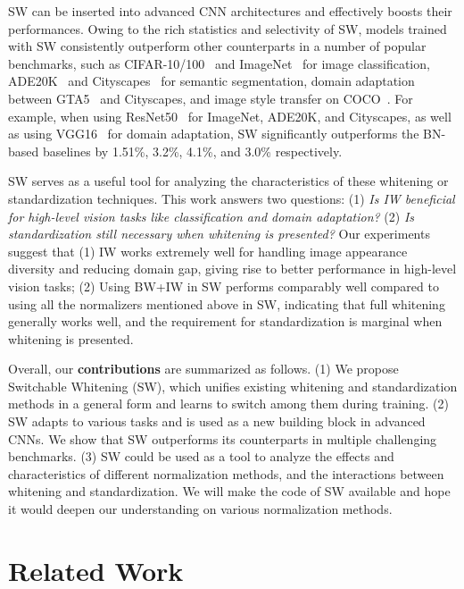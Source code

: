 \documentclass[10pt,twocolumn,letterpaper]{article}
\begin{document}
SW can be inserted into advanced CNN architectures and effectively boosts their performances.
Owing to the rich statistics and selectivity of SW, models trained with SW consistently outperform other counterparts in a number of popular benchmarks, such as CIFAR-10/100~\cite{krizhevsky2009learning} and ImageNet~\cite{deng2009imagenet} for image classification, ADE20K~\cite{zhou2017scene} and Cityscapes~\cite{cordts2016cityscapes} for semantic segmentation, domain adaptation between GTA5~\cite{Richter_2016_ECCV} and Cityscapes, and image style transfer on COCO~\cite{lin2014microsoft}.
For example, when using ResNet50~\cite{he2016deep} for ImageNet, ADE20K, and Cityscapes, as well as using VGG16~\cite{simonyan2014very} for domain adaptation, SW significantly outperforms the BN-based baselines by 1.51\%, 3.2\%, 4.1\%, and 3.0\% respectively.

SW serves as a useful tool for analyzing the characteristics of these whitening or standardization techniques.
This work answers two questions: 
(1) \textit{Is IW beneficial for high-level vision tasks like classification and domain adaptation?} 
(2) \textit{Is standardization still necessary when whitening is presented?}
Our experiments suggest that (1) IW works extremely well for handling image appearance diversity and reducing domain gap, giving rise to better performance in high-level vision tasks;
(2) Using BW+IW in SW performs comparably well compared to using all the normalizers mentioned above in SW, indicating that full whitening generally works well, and the requirement for standardization is marginal when whitening is presented.




Overall, our \textbf{contributions} are summarized as follows. 
(1) We propose Switchable Whitening (SW), which unifies existing whitening and standardization methods in a general form and learns to switch among them during training.
(2) SW adapts to various tasks and is used as a new building block in advanced CNNs. We show that SW outperforms its counterparts in multiple challenging benchmarks.
(3) SW could be used as a tool to analyze the effects and characteristics of different normalization methods, and the interactions between whitening and standardization.
We will make the code of SW available and hope it would deepen our understanding on various normalization methods.
 	

\section{Related Work}
\end{document}
